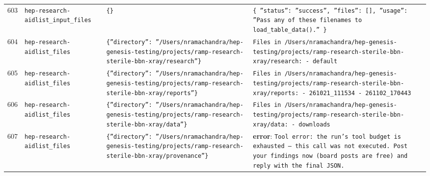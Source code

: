 \documentclass[11pt,a4paper]{article}
\begin{document}
\begin{longtable}{@{}p{}p{}p{}p{}@{}}
603 & \texttt{hep-research-aid}\newline\texttt{list\_\allowbreak{}input\_\allowbreak{}files} & \texttt{\{\}\allowbreak{}} & \texttt{\{   ''status'':\allowbreak{} ''success'',\allowbreak{}   ''files'':\allowbreak{} []\allowbreak{},\allowbreak{}   ''usage'':\allowbreak{} ''Pass any of these filenames to load\_\allowbreak{}table\_\allowbreak{}data()\allowbreak{}.'' \}\allowbreak{}} \\
604 & \texttt{hep-research-aid}\newline\texttt{list\_\allowbreak{}files} & \texttt{\{''directory'':\allowbreak{} ''/\allowbreak{}Users/\allowbreak{}nramachandra/\allowbreak{}hep-genesis-testing/\allowbreak{}projects/\allowbreak{}ramp-research-sterile-bbn-xray/\allowbreak{}research''\}\allowbreak{}} & \texttt{Files in /\allowbreak{}Users/\allowbreak{}nramachandra/\allowbreak{}hep-genesis-testing/\allowbreak{}projects/\allowbreak{}ramp-research-sterile-bbn-xray/\allowbreak{}research:\allowbreak{}   - default} \\
605 & \texttt{hep-research-aid}\newline\texttt{list\_\allowbreak{}files} & \texttt{\{''directory'':\allowbreak{} ''/\allowbreak{}Users/\allowbreak{}nramachandra/\allowbreak{}hep-genesis-testing/\allowbreak{}projects/\allowbreak{}ramp-research-sterile-bbn-xray/\allowbreak{}reports''\}\allowbreak{}} & \texttt{Files in /\allowbreak{}Users/\allowbreak{}nramachandra/\allowbreak{}hep-genesis-testing/\allowbreak{}projects/\allowbreak{}ramp-research-sterile-bbn-xray/\allowbreak{}reports:\allowbreak{}   - 261021\_\allowbreak{}111534   - 261102\_\allowbreak{}170443} \\
606 & \texttt{hep-research-aid}\newline\texttt{list\_\allowbreak{}files} & \texttt{\{''directory'':\allowbreak{} ''/\allowbreak{}Users/\allowbreak{}nramachandra/\allowbreak{}hep-genesis-testing/\allowbreak{}projects/\allowbreak{}ramp-research-sterile-bbn-xray/\allowbreak{}data''\}\allowbreak{}} & \texttt{Files in /\allowbreak{}Users/\allowbreak{}nramachandra/\allowbreak{}hep-genesis-testing/\allowbreak{}projects/\allowbreak{}ramp-research-sterile-bbn-xray/\allowbreak{}data:\allowbreak{}   - downloads} \\
607 & \texttt{hep-research-aid}\newline\texttt{list\_\allowbreak{}files} & \texttt{\{''directory'':\allowbreak{} ''/\allowbreak{}Users/\allowbreak{}nramachandra/\allowbreak{}hep-genesis-testing/\allowbreak{}projects/\allowbreak{}ramp-research-sterile-bbn-xray/\allowbreak{}provenance''\}\allowbreak{}} & \textbf{error}: \texttt{Tool error:\allowbreak{} the run's tool budget is exhausted --- this call was not executed. Post your findings now (board posts are free)\allowbreak{} and reply with the final JSON.} \\

\end{longtable}
\end{document}

